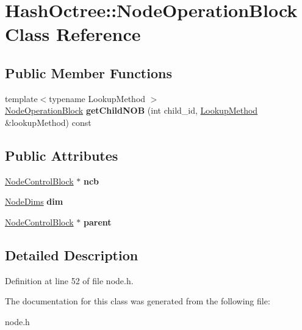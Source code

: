 \hypertarget{class_hash_octree_1_1_node_operation_block}{}\section{Hash\+Octree\+::Node\+Operation\+Block Class Reference}
\label{class_hash_octree_1_1_node_operation_block}
\subsection*{Public Member Functions}
\begin{DoxyCompactItemize}
\item 
\mbox{\label{class_hash_octree_1_1_node_operation_block_a217f08cbe440f1b2f3edf49b9aad078a}} 
{\footnotesize template$<$typename Lookup\+Method $>$ }\\\mbox{\hyperlink{class_hash_octree_1_1_node_operation_block}{Node\+Operation\+Block}} {\bfseries get\+Child\+N\+OB} (int child\+\_\+id, \mbox{\hyperlink{class_hash_octree_1_1_lookup_method}{Lookup\+Method}} \&lookup\+Method) const
\end{DoxyCompactItemize}
\subsection*{Public Attributes}
\begin{DoxyCompactItemize}
\item 
\mbox{\label{class_hash_octree_1_1_node_operation_block_a52271de267125129457c47e9d4af40e3}} 
\mbox{\hyperlink{class_hash_octree_1_1_node_control_block}{Node\+Control\+Block}} $\ast$ {\bfseries ncb}
\item 
\mbox{\label{class_hash_octree_1_1_node_operation_block_a0bd05ede83039957325655369d7f41ac}} 
\mbox{\hyperlink{class_hash_octree_1_1_node_dims}{Node\+Dims}} {\bfseries dim}
\item 
\mbox{\label{class_hash_octree_1_1_node_operation_block_a6fd82cb0f913f524375454f47534a5b9}} 
\mbox{\hyperlink{class_hash_octree_1_1_node_control_block}{Node\+Control\+Block}} $\ast$ {\bfseries parent}
\end{DoxyCompactItemize}


\subsection{Detailed Description}


Definition at line 52 of file node.\+h.



The documentation for this class was generated from the following file\+:\begin{DoxyCompactItemize}
\item 
node.\+h\end{DoxyCompactItemize}
